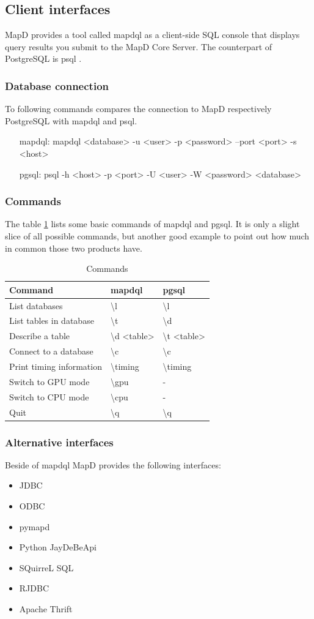 \newpage
\subsection{Client interfaces}
MapD provides a tool called mapdql \cite{mapdql} as a client-side SQL console that displays query results you submit to the MapD Core Server.
The counterpart of PostgreSQL is psql \cite{psql}.

\subsubsection{Database connection}
To following commands compares the connection to MapD respectively PostgreSQL with mapdql and psql.
\begin{itemize}[noitemsep]
 \item[mapdql:]  mapdql <database>  -u <user> -p <password> --port <port> -s <host>
 \item[pgsql:]  psql -h <host> -p <port> -U <user> -W <password> <database>
\end{itemize}

\subsubsection{Commands}
The table \ref{tab:commands} lists some basic commands of mapdql and pgsql.
It is only a slight slice of all possible commands, but another good example to point out how much in common those two products have.
\begin{table}[H]
\centering
\begin{tabular}{ |l|l|l| }
\hline
Command & mapdql & pgsql  \\
\hline
	List databases & \textbackslash l &  \textbackslash l \\
	List tables in database & \textbackslash t &  \textbackslash d \\
	Describe a table & \textbackslash d <table> & \textbackslash t <table> \\
	Connect to a database &  \textbackslash c  & \textbackslash c \\
	Print timing information & \textbackslash timing & \textbackslash timing \\
	Switch to GPU mode & \textbackslash gpu & - \\
	Switch to CPU mode & \textbackslash cpu & - \\
	Quit & \textbackslash q & \textbackslash q \\
\hline
\end{tabular}
\caption{Commands}
\label{tab:commands}
\end{table}

\subsubsection{Alternative interfaces}
Beside of mapdql MapD provides the following interfaces:
\begin{itemize}
 \item JDBC
 \item ODBC
 \item pymapd
 \item Python JayDeBeApi
 \item SQuirreL SQL
 \item RJDBC
 \item Apache Thrift
\end{itemize}